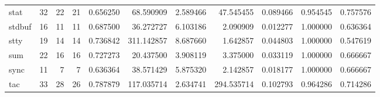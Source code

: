 \begin{longtable}{lrrrrrrrrrr}
stat      &                                      32 &                 22 &                                21 &                                   0.656250 &                              68.590909 &                                     2.589466 &                         47.545455 &                                0.089466 &                           0.954545 &                                           0.757576 \\
stdbuf    &                                      16 &                 11 &                                11 &                                   0.687500 &                              36.272727 &                                     6.103186 &                          2.090909 &                                0.012277 &                           1.000000 &                                           0.636364 \\
stty      &                                      19 &                 14 &                                14 &                                   0.736842 &                             311.142857 &                                     8.687660 &                          1.642857 &                                0.044803 &                           1.000000 &                                           0.547619 \\
sum       &                                      22 &                 16 &                                16 &                                   0.727273 &                              20.437500 &                                     3.908119 &                          3.375000 &                                0.033119 &                           1.000000 &                                           0.666667 \\
sync      &                                      11 &                  7 &                                 7 &                                   0.636364 &                              38.571429 &                                     5.875320 &                          2.142857 &                                0.018177 &                           1.000000 &                                           0.666667 \\
tac       &                                      33 &                 28 &                                26 &                                   0.787879 &                             117.035714 &                                     2.634741 &                        294.535714 &                                0.102793 &                           0.964286 &                                           0.714286 \\

\end{longtable}
